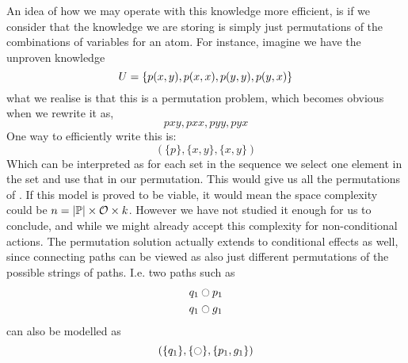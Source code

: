 \documentclass[../Master.tex]{subfiles}
\begin{document}
An idea of how we may operate with this knowledge more efficient, is if we consider that the knowledge we are storing is simply just permutations of the combinations of variables for an atom.
For instance, imagine we have the unproven knowledge
 \begin{equation*}
	U = \{ p(x,y), p(x,x), p(y,y), p(y,x) \}
 \end{equation*} 
 what we realise is that this is a permutation problem, which becomes obvious when we rewrite it as,
 \begin{equation}\label{eq:dis:sc:perms}
 	pxy, pxx, pyy, pyx 
 \end{equation} 
 One way to efficiently write this is:
  \begin{equation*}
  	(\{p\},\{x,y\},\{x,y\}) 
  \end{equation*} 
 Which can be interpreted as for each set in the sequence we select one element in the set and use that in our permutation.
 This would give us all the permutations of . 
 If this model is proved to be viable, it would mean the space complexity could be $n = |\mathbb{P}| \times \mathcal{O} \times k$. 
 However we have not studied it enough for us to conclude,
 and while we might already accept this complexity for non-conditional actions. 
 The permutation solution actually extends to conditional effects as well, since connecting paths can be viewed as also just different permutations of the possible strings of paths.
 I.e. two paths such as 
 \begin{align*}
	q_1 &\ocircle p_1 \\
	q_1 &\ocircle g_1
 \end{align*} 
 can also be modelled as
 \begin{equation*}
 	(\{q_1\},\{\ocircle\},\{p_1,g_1\}) 
 \end{equation*} 
\end{document}
